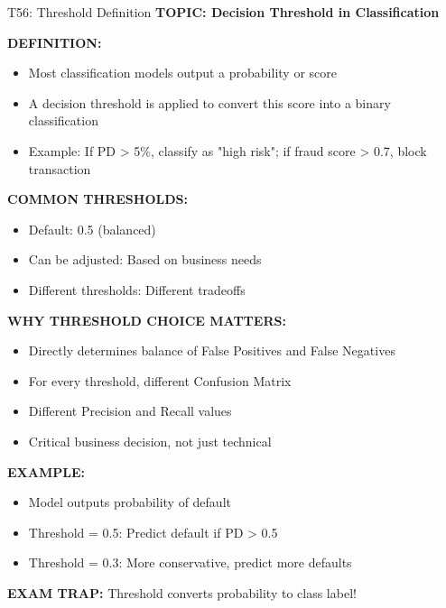 \documentclass[8pt]{beamer}
\begin{document}
	\begin{frame}{T56: Threshold Definition}
		\fontsize{6.5}{7.5}\selectfont
		\textbf{TOPIC: Decision Threshold in Classification}
		
		\vspace{0.1cm}
		\textbf{DEFINITION:}
		\begin{itemize}
			\item Most classification models output a probability or score
			\item A decision threshold is applied to convert this score into a binary classification
			\item Example: If PD > 5\%, classify as "high risk"; if fraud score > 0.7, block transaction
		\end{itemize}
		
		\vspace{0.1cm}
		\textbf{COMMON THRESHOLDS:}
		\begin{itemize}
			\item \textcolor{myblue}{Default:} 0.5 (balanced)
			\item \textcolor{myblue}{Can be adjusted:} Based on business needs
			\item \textcolor{myblue}{Different thresholds:} Different tradeoffs
		\end{itemize}
		
		\vspace{0.1cm}
		\textbf{WHY THRESHOLD CHOICE MATTERS:}
		\begin{itemize}
			\item Directly determines balance of False Positives and False Negatives
			\item For every threshold, different Confusion Matrix
			\item Different Precision and Recall values
			\item Critical business decision, not just technical
		\end{itemize}
		
		\vspace{0.1cm}
		\textbf{EXAMPLE:}
		\begin{itemize}
			\item Model outputs probability of default
			\item Threshold = 0.5: Predict default if PD > 0.5
			\item Threshold = 0.3: More conservative, predict more defaults
		\end{itemize}
		
		\textcolor{myred}{\textbf{EXAM TRAP:}} Threshold converts \textcolor{myblue}{probability to class label}!
	\end{frame}
	
\end{document}
